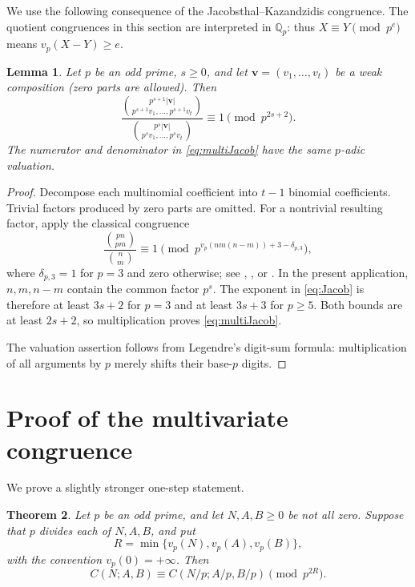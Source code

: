 \documentclass[11pt,reqno]{amsart}
\numberwithin{equation}{section}
\newtheorem{theorem}{Theorem}[section]
\newtheorem{lemma}[theorem]{Lemma}
\theoremstyle{remark}
\newcommand{\Qp}{\mathbb Q_p}
\newcommand{\vp}{v_p}
\begin{document}
We use the following consequence of the Jacobsthal--Kazandzidis
congruence.  The quotient congruences in this section are interpreted in
\(\Qp\): thus \(X\equiv Y\pmod {p^e}\) means
\(\vp(X-Y)\geq e\).

\begin{lemma}\label{lem:Jacobsthal}
Let \(p\) be an odd prime, \(s\geq0\), and let
\(\boldsymbol{v}=(v_1,\ldots,v_t)\) be a weak composition (zero parts are
allowed).  Then
\begin{equation}\label{eq:multiJacob}
\frac{\binom{p^{s+1}|\boldsymbol v|}
 {p^{s+1}v_1,\ldots,p^{s+1}v_t}}
 {\binom{p^s|\boldsymbol v|}
 {p^sv_1,\ldots,p^sv_t}}
\equiv1\pmod {p^{2s+2}}.
\end{equation}
The numerator and denominator in \eqref{eq:multiJacob} have the same
\(p\)-adic valuation.
\end{lemma}

\begin{proof}
Decompose each multinomial coefficient into \(t-1\) binomial coefficients.
Trivial factors produced by zero parts are omitted.
For a nontrivial resulting factor, apply the classical congruence
\begin{equation}\label{eq:Jacob}
\frac{\binom{pn}{pm}}{\binom nm}
\equiv1\pmod {p^{\vp(nm(n-m))+3-\delta_{p,3}}},
\end{equation}
where \(\delta_{p,3}=1\) for \(p=3\) and zero otherwise; see
\cite{Jacobsthal1952}, \cite[p.~255]{Granville1997}, or
\cite[Lemma~4.1]{Gorodetsky2023}.
In the present application, \(n,m,n-m\) contain the common factor \(p^s\).
The exponent in \eqref{eq:Jacob} is therefore at least \(3s+2\) for \(p=3\)
and at least \(3s+3\) for \(p\geq5\).  Both bounds are at least \(2s+2\),
so multiplication proves \eqref{eq:multiJacob}.

The valuation assertion follows from Legendre's digit-sum formula:
multiplication of all arguments by \(p\) merely shifts their base-\(p\)
digits.
\end{proof}

\section{Proof of the multivariate congruence}

We prove a slightly stronger one-step statement.

\begin{theorem}\label{thm:strong}
Let \(p\) be an odd prime, and let \(N,A,B\geq0\) be not all zero.
Suppose that \(p\) divides each of \(N,A,B\), and put
\[
R=\min\{\vp(N),\vp(A),\vp(B)\},
\]
with the convention \(\vp(0)=+\infty\).  Then
\begin{equation}\label{eq:strong}
C(N;A,B)\equiv C(N/p;A/p,B/p)\pmod {p^{2R}}.
\end{equation}
\end{theorem}
\end{document}
